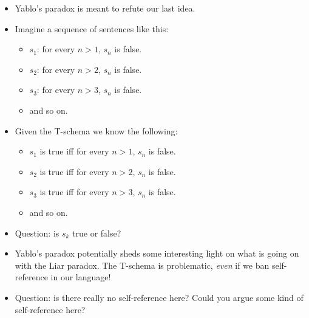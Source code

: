 \documentclass[justified]{tufte-handout}
\begin{document}
\begin{itemize}

\item Yablo's paradox is meant to refute our last idea.

\item Imagine a sequence of sentences like this: 

\begin{itemize}

\item $s_1$: for every $n>1$, $s_n$ is false. 

\item $s_2$: for every $n>2$, $s_n$ is false. 

\item $s_3$: for every $n>3$, $s_n$ is false. 

\item and so on.


\end{itemize}



\item Given the T-schema we know the following: 


\begin{itemize}

\item $s_1$ is true iff for every $n>1$, $s_n$ is false. 

\item $s_2$ is true iff for every $n>2$, $s_n$ is false. 

\item $s_3$ is true iff for every $n>3$, $s_n$ is false. 

\item and so on.


\end{itemize}

\item Question: is $s_k$ true or false? 


\item Yablo's paradox potentially sheds some interesting light on what is going on with the Liar paradox. The T-schema is problematic, \emph{even} if we ban self-reference in our language!

\item Question: is there really no self-reference here? Could you argue some kind of self-reference here?




\end{itemize}
\end{document}
